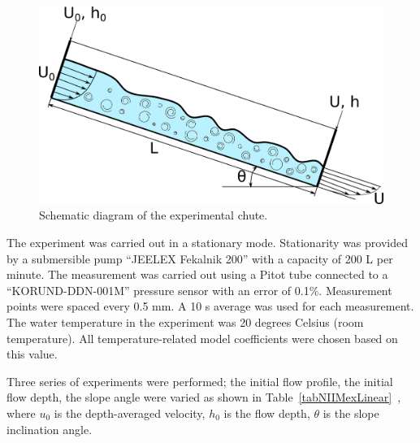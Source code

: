 \documentclass[mathematics,article,accept,pdftex,moreauthors]{Definitions/mdpi}
\begin{document}
\begin{figure}[H]
 
\includegraphics[width=10.5 cm]{NIIMexLinearUProfileInlet.png}
\caption{Schematic diagram of the experimental chute.\label{NIIMexLinearUProfileInlet}}
 
\end{figure}   
 

The experiment was carried out in a stationary mode. Stationarity was provided by a submersible pump ``JEELEX Fekalnik 200'' with a capacity of 200 L per minute. The measurement was carried out using a Pitot tube connected to a ``KORUND-DDN-001M'' pressure sensor with an error of 0.1\%. Measurement points were spaced every 0.5 mm. A 10 s average was used for each measurement. The water temperature in the experiment was 20 degrees Celsius (room temperature). All temperature-related model coefficients were chosen based on this value. 

Three series of experiments were performed; the initial flow profile, the initial flow depth, the slope angle were varied as shown in Table~\ref{tabNIIMexLinear}~\cite{fluids7030111}, where $u_0$ is the depth-averaged velocity, $h_0$ is the flow depth, $\theta$ is the slope inclination angle.

\end{document}
